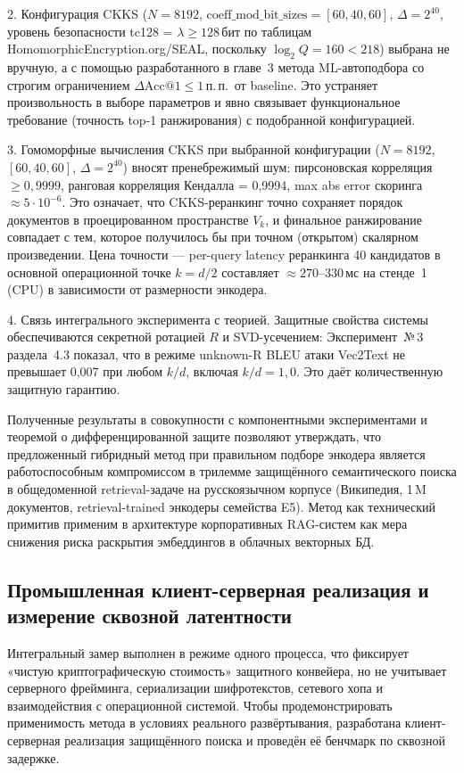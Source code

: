 \documentclass[a4paper, 12pt, oneside, openany]{article}
\begin{document}
2. Конфигурация CKKS ($N = 8192$, $\mathrm{coeff\_mod\_bit\_sizes} = [60, 40, 60]$, $\Delta = 2^{40}$, уровень безопасности tc128 = $\lambda \geq 128$\,бит по таблицам HomomorphicEncryption.org/SEAL, поскольку $\log_{2} Q = 160 < 218$) выбрана не вручную, а с помощью разработанного в главе~3 метода ML-автоподбора со строгим ограничением $\Delta\mathrm{Acc@1} \leq 1$\,п.\,п.\ от baseline. Это устраняет произвольность в выборе параметров и явно связывает функциональное требование (точность top-1 ранжирования) с подобранной конфигурацией.

3. Гомоморфные вычисления CKKS при выбранной конфигурации ($N = 8192$, $[60, 40, 60]$, $\Delta = 2^{40}$) вносят пренебрежимый шум: пирсоновская корреляция $\geq 0{,}9999$, ранговая корреляция Кендалла = 0,9994, max abs error скоринга $\approx 5\cdot 10^{-6}$. Это означает, что CKKS-реранкинг точно сохраняет порядок документов в проецированном пространстве $V_k$, и финальное ранжирование совпадает с тем, которое получилось бы при точном (открытом) скалярном произведении. Цена точности --- per-query latency реранкинга 40 кандидатов в основной операционной точке $k = d/2$ составляет $\approx 270$--$330$\,мс на стенде~1 (CPU) в зависимости от размерности энкодера.

4. Связь интегрального эксперимента с теорией. Защитные свойства системы  обеспечиваются секретной ротацией $R$ и SVD-усечением: Эксперимент~№\,3 раздела~4.3 показал, что в режиме unknown-R BLEU атаки Vec2Text не превышает 0,007 при любом $k/d$, включая $k/d = 1{,}0$. Это даёт количественную защитную гарантию.


Полученные результаты в совокупности с компонентными экспериментами и теоремой о дифференцированной защите позволяют утверждать, что предложенный гибридный метод при правильном подборе энкодера является работоспособным компромиссом в трилемме защищённого семантического поиска в общедоменной retrieval-задаче на русскоязычном корпусе (Википедия, 1\,M документов, retrieval-trained энкодеры семейства E5).  Метод как технический примитив применим в архитектуре корпоративных RAG-систем как мера снижения риска раскрытия эмбеддингов в облачных векторных БД.

\subsection{Промышленная клиент-серверная реализация и измерение сквозной латентности}\label{subsec:cs-impl}

Интегральный замер выполнен в режиме одного процесса, что фиксирует «чистую криптографическую стоимость» защитного конвейера, но не учитывает серверного фрейминга, сериализации шифротекстов, сетевого хопа и взаимодействия с операционной системой. Чтобы продемонстрировать применимость метода в условиях реального развёртывания, разработана клиент-серверная реализация защищённого поиска и проведён её бенчмарк по сквозной задержке.
\end{document}
